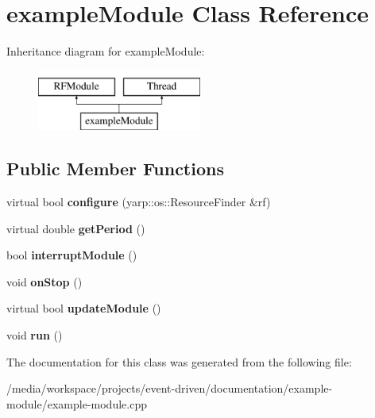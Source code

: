 \hypertarget{classexampleModule}{}\section{example\+Module Class Reference}
\label{classexampleModule}
Inheritance diagram for example\+Module\+:\begin{figure}[H]
\begin{center}
\leavevmode
\includegraphics[height=2.000000cm]{classexampleModule}
\end{center}
\end{figure}
\subsection*{Public Member Functions}
\begin{DoxyCompactItemize}
\item 
\mbox{\label{classexampleModule_ad4d614a75a36e54b416b95ce48e23809}} 
virtual bool {\bfseries configure} (yarp\+::os\+::\+Resource\+Finder \&rf)
\item 
\mbox{\label{classexampleModule_a9316bf049434e746a26242f30226f0ff}} 
virtual double {\bfseries get\+Period} ()
\item 
\mbox{\label{classexampleModule_af7f744b259d435200d1669d138d6c6cd}} 
bool {\bfseries interrupt\+Module} ()
\item 
\mbox{\label{classexampleModule_a5263e596f82ccaf25f39e41c399c23aa}} 
void {\bfseries on\+Stop} ()
\item 
\mbox{\label{classexampleModule_ae2b99b0679b122d2aeb53aa44f106f55}} 
virtual bool {\bfseries update\+Module} ()
\item 
\mbox{\label{classexampleModule_a62c8579890452322481beb0f6aedb1a4}} 
void {\bfseries run} ()
\end{DoxyCompactItemize}


The documentation for this class was generated from the following file\+:\begin{DoxyCompactItemize}
\item 
/media/workspace/projects/event-\/driven/documentation/example-\/module/example-\/module.\+cpp\end{DoxyCompactItemize}
